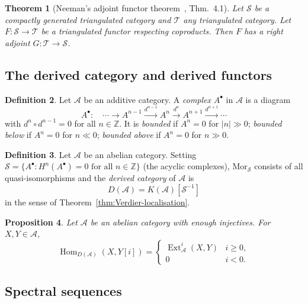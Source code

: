 \documentclass[12pt,a4paper]{article}
\newtheorem{theorem}{Theorem}[section]
\newtheorem{proposition}[theorem]{Proposition}
\theoremstyle{definition}
\newtheorem{definition}[theorem]{Definition}
\newcommand{\Hom}{\operatorname{Hom}}
\newcommand{\Ext}{\operatorname{Ext}}
\newcommand{\Z}{\mathbb{Z}}
\begin{document}
\begin{theorem}[Neeman's adjoint functor theorem~\cite{Nee96}, Thm.\ 4.1]\label{thm:Neeman}
Let $\mathcal{S}$ be a compactly generated triangulated category and $\mathcal{T}$
any triangulated category.  Let $F:\mathcal{S}\to\mathcal{T}$ be a triangulated
functor respecting coproducts.  Then $F$ has a right adjoint
$G:\mathcal{T}\to\mathcal{S}$.
\end{theorem}

\subsection{The derived category and derived functors}

\begin{definition}\label{def:complex}
Let $\mathcal{A}$ be an additive category.  A \emph{complex} $A^\bullet$ in
$\mathcal{A}$ is a diagram
\[
  A^\bullet:\quad\cdots\longrightarrow A^{n-1}\xrightarrow{d^{n-1}} A^n
  \xrightarrow{d^n} A^{n+1}\xrightarrow{d^{n+1}}\cdots
\]
with $d^n\circ d^{n-1}=0$ for all $n\in\Z$.  It is \emph{bounded} if
$A^n=0$ for $|n|\gg 0$; \emph{bounded below} if $A^n=0$ for $n\ll 0$;
\emph{bounded above} if $A^n=0$ for $n\gg 0$.
\end{definition}

\begin{definition}\label{def:derived}
Let $\mathcal{A}$ be an abelian category.  Setting
$\mathcal{S}=\{A^\bullet: H^n(A^\bullet)=0\text{ for all }n\in\Z\}$
(the acyclic complexes), $\mathrm{Mor}_\mathcal{S}$ consists of all quasi-isomorphisms
and the \emph{derived category} of $\mathcal{A}$ is
\[
  D(\mathcal{A}) = K(\mathcal{A})[\mathcal{S}^{-1}]
\]
in the sense of Theorem~\ref{thm:Verdier-localisation}.
\end{definition}

\begin{proposition}\label{prop:Ext-Hom}
Let $\mathcal{A}$ be an abelian category with enough injectives.  For $X,Y\in\mathcal{A}$,
\[
  \Hom_{D(\mathcal{A})}(X,Y[i]) =
  \begin{cases}
    \Ext^i_\mathcal{A}(X,Y) & i\geq 0,\\
    0 & i<0.
  \end{cases}
\]
\end{proposition}

\subsection{Spectral sequences}
\label{subsec:spectral-sequences}
\end{document}
